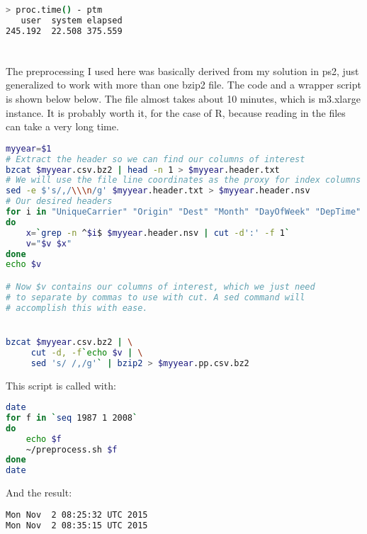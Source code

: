 \documentclass{article}\usepackage[]{graphicx}\usepackage[]{color}
\begin{document}
\begin{lstlisting}[language=bash,caption={Timing for all\_preprocess.sh}]
> proc.time() - ptm
   user  system elapsed 
245.192  22.508 375.559 
\end{lstlisting}

\section{}

The preprocessing I used here was basically derived from my solution in ps2, just generalized to work with more than one bzip2 file.  The code and a wrapper script is shown below below.  The file almost takes about 10 minutes, which is m3.xlarge instance.  It is probably worth it, for the case of R, because reading in the files can take a very long time.

\begin{lstlisting}[language=bash,caption={all\_preprocess.sh}]
myyear=$1
# Extract the header so we can find our columns of interest
bzcat $myyear.csv.bz2 | head -n 1 > $myyear.header.txt
# We will use the file line coordinates as the proxy for index columns
sed -e $'s/,/\\\n/g' $myyear.header.txt > $myyear.header.nsv
# Our desired headers
for i in "UniqueCarrier" "Origin" "Dest" "Month" "DayOfWeek" "DepTime" "DepDelay"
do
    x=`grep -n ^$i$ $myyear.header.nsv | cut -d':' -f 1`
    v="$v $x"
done
echo $v

# Now $v contains our columns of interest, which we just need
# to separate by commas to use with cut. A sed command will
# accomplish this with ease.


bzcat $myyear.csv.bz2 | \
     cut -d, -f`echo $v | \
     sed 's/ /,/g'` | bzip2 > $myyear.pp.csv.bz2
\end{lstlisting}

This script is called with:

\begin{lstlisting}[language=bash,caption={preprocess.sh}]
date
for f in `seq 1987 1 2008`
do
    echo $f
    ~/preprocess.sh $f
done
date
\end{lstlisting}

And the result:

\begin{lstlisting}[language=bash,caption={Timing for all\_preprocess.sh}]
Mon Nov  2 08:25:32 UTC 2015
Mon Nov  2 08:35:15 UTC 2015
\end{lstlisting}
\end{document}
